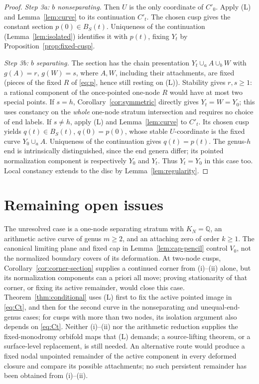 \documentclass[11pt]{article}
\theoremstyle{remark}
\begin{document}
\begin{proof}
\emph{Step 3a: \(b\) nonseparating.}
Then \(U\) is the only coordinate of \(C'_0\). Apply (L) and
Lemma~\ref{lem:curve} to its continuation \(C'_t\). The chosen
cusp gives the constant section \(p(0)\in B_S(t)\). Uniqueness of
the continuation (Lemma~\ref{lem:isolated}) identifies it with
\(p(t)\), fixing \(Y_t\) by Proposition~\ref{prop:fixed-cusp}.

\emph{Step 3b: \(b\) separating.}
The section has the chain presentation
\(Y_t\cup_a A\cup_b W\) with \(g(A)=r\), \(g(W)=s\),
where \(A,W\), including their attachments, are fixed (pieces of
the fixed \(R\) of \eqref{eq:p}, hence still resting on (L)).
Stability gives \(r,s\ge1\): a rational component of the
once-pointed one-node \(R\) would have at most two special
points. If \(s=h\), Corollary~\ref{cor:symmetric} directly
gives \(Y_t=W=Y_0\); this uses constancy on the \emph{whole}
one-node stratum intersection and requires no choice of
end labels. If \(s\ne h\), apply (L) and Lemma~\ref{lem:curve} to
\(C'_t\). Its chosen cusp yields \(q(t)\in B_S(t)\), \(q(0)=p(0)\),
whose stable \(U\)-coordinate is the fixed curve \(Y_0\cup_a A\).
Uniqueness of the continuation gives \(q(t)=p(t)\). The genus-\(h\) end
is intrinsically distinguished, since the end genera differ;
its pointed normalization component is respectively \(Y_0\)
and \(Y_t\). Thus \(Y_t=Y_0\) in this case too.
Local constancy extends to the disc by Lemma~\ref{lem:regularity}.
\end{proof}

\section{Remaining open issues}\label{sec:open}

The unresolved case is a one-node separating stratum with
\(K_N=\mathbb Q\), an arithmetic active curve of genus \(m\ge2\),
and an attaching zero of order \(k\ge1\).
The canonical limiting plane and fixed cap in
Lemma~\ref{lem:cap-pencil} control \(V_0\), not the normalized
boundary covers of its deformation. At two-node cusps,
Corollary~\ref{cor:corner-section} supplies a continued
corner from (i)--(ii) alone, but its normalization components
can a priori all move; proving stationarity of that corner,
or fixing its active remainder, would close this case.
Theorem~\ref{thm:conditional} uses (L) first to fix the active
pointed image in \eqref{eq:Ct}, and then for the second curve
in the nonseparating and unequal-end-genus cases; for cusps with
more than two nodes, its isolation argument also depends on
\eqref{eq:Ct}. Neither (i)--(ii) nor the arithmetic reduction
supplies the fixed-monodromy orbifold maps that (L) demands; a
source-lifting theorem, or a surface-level replacement, is still
needed. An alternative route would produce a fixed nodal unpointed remainder
of the active component in every deformed closure and compare its
possible attachments; no such persistent remainder has been
obtained from (i)--(ii).
\end{document}
